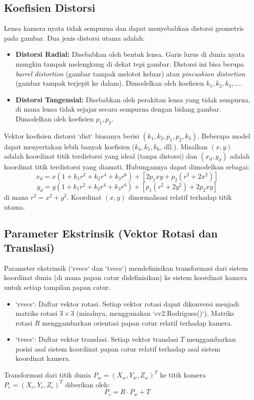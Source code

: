 \documentclass[12pt,a4paper]{article}
\begin{document}
\subsection{Koefisien Distorsi}
Lensa kamera nyata tidak sempurna dan dapat menyebabkan distorsi geometris pada
gambar. Dua jenis distorsi utama adalah:
\begin{itemize}
    \item \textbf{Distorsi Radial:} Disebabkan oleh bentuk lensa. Garis lurus di dunia nyata mungkin tampak melengkung di dekat tepi gambar. Distorsi ini bisa berupa \textit{barrel distortion} (gambar tampak melotot keluar) atau \textit{pincushion distortion} (gambar tampak terjepit ke dalam). Dimodelkan oleh koefisien $k_1, k_2, k_3, \dots$.
    \item \textbf{Distorsi Tangensial:} Disebabkan oleh perakitan lensa yang tidak sempurna, di mana lensa tidak sejajar secara sempurna dengan bidang gambar. Dimodelkan oleh koefisien $p_1, p_2$.
\end{itemize}
Vektor koefisien distorsi `dist` biasanya berisi $(k_1, k_2, p_1, p_2, k_3)$. Beberapa model dapat menyertakan lebih banyak koefisien ($k_4, k_5, k_6$, dll.).
Misalkan $(x, y)$ adalah koordinat titik terdistorsi yang ideal (tanpa distorsi) dan $(x_d, y_d)$ adalah koordinat titik terdistorsi yang diamati. Hubungannya dapat dimodelkan sebagai:
$$ x_d = x(1 + k_1 r^2 + k_2 r^4 + k_3 r^6) + [2 p_1 xy + p_2(r^2 + 2x^2)] $$
$$ y_d = y(1 + k_1 r^2 + k_2 r^4 + k_3 r^6) + [p_1(r^2 + 2y^2) + 2 p_2 xy] $$
di mana $r^2 = x^2 + y^2$. Koordinat $(x,y)$ dinormalisasi relatif terhadap titik utama.

\subsection{Parameter Ekstrinsik (Vektor Rotasi dan Translasi)}
Parameter ekstrinsik (`rvecs` dan `tvecs`) mendefinisikan transformasi dari
sistem koordinat dunia (di mana papan catur didefinisikan) ke sistem koordinat
kamera untuk setiap tampilan papan catur.
\begin{itemize}
    \item `rvecs`: Daftar vektor rotasi. Setiap vektor rotasi dapat dikonversi menjadi matriks rotasi $3 \times 3$ (misalnya, menggunakan `cv2.Rodrigues()`). Matriks rotasi $R$ menggambarkan orientasi papan catur relatif terhadap kamera.
    \item `tvecs`: Daftar vektor translasi. Setiap vektor translasi $T$ menggambarkan posisi asal sistem koordinat papan catur relatif terhadap asal sistem koordinat kamera.
\end{itemize}
Transformasi dari titik dunia $P_w = (X_w, Y_w, Z_w)^T$ ke titik kamera $P_c = (X_c, Y_c, Z_c)^T$ diberikan oleh:
$$ P_c = R \cdot P_w + T $$
\end{document}

